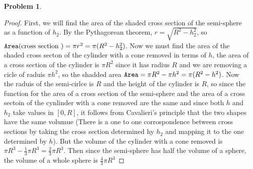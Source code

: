 \documentclass{article}
\newcommand{\A}{{\tt Area}}
\newtheorem{prb}{Problem}
\begin{document}
	   \begin{prb}  \end{prb} 
	   \begin{proof} 
	   	First, we will find the area of the shaded cross section of the semi-sphere as a function of $h_2$. 
		By the Pythagorean theorem, $r = \sqrt{R^2 - h_2^2} $, so $\A( \text{cross section }) = \pi r^2 
		= \pi(R^2 - h_2^2)$. Now we must find the area of the shaded cross secton of the cylinder with 
		a cone removed in terms of $h$, the area of a cross section of the cylinder is $\pi R^2$ since 
		it has radius $R$ and we are removing a cicle of raduis $\pi h^2$, so the shadded area 
		$\A = \pi R^2 - \pi h^2 = \pi(R^2 - h^2)$. Now the raduis of the semi-cirlce is $R$ and the 
		height of the cylinder is $R$, so since the function for the area of a cross section 
		of the semi-sphere and the area of a cross sectoin of the cynlinder with a cone removed are the same
		and since both $h$ and $h_2$ take values in $[0, R]$, it follows from Cavalieri's principle that 
		the two shapes have the same volumue (There is a one to one corrospondence between cross sections
		by taking the cross section determined hy $h_2$ and mapping it to the one determined by $h$). 
		But the volume of the cylinder with a cone removed is $\pi R^3 - \frac{1}{3}\pi R^3 = \frac{2}{3} \pi R^3$. 
		Then since the semi-sphere has half the volume of a sphere, the volume of a whole sphere is 
		$\frac{4}{3} \pi R^3$
	   \end{proof} 
\end{document}
